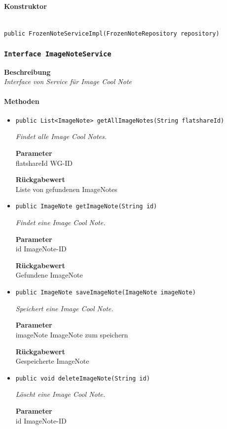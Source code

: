     \paragraph*{Konstruktor}\mbox{} \\
    \texttt{public FrozenNoteServiceImpl(FrozenNoteRepository repository)} \\
    \subsubsection{\texttt{Interface ImageNoteService}}
    \textbf{Beschreibung} \\
    \textit{Interface von Service für Image Cool Note}
    \paragraph*{Methoden}
    \begin{itemize}
    	\item{\texttt{public List<ImageNote> getAllImageNotes(String flatshareId)}}
    	
    	\textit{Findet alle Image Cool Notes.}
    	
    	\textbf{Parameter} \\
    	flatshareId WG-ID
    	
    	\textbf{Rückgabewert} \\
    	Liste von gefundenen ImageNotes        \item{\texttt{public ImageNote getImageNote(String id)}}
    	
    	\textit{Findet eine Image Cool Note.}
    	
    	\textbf{Parameter} \\
    	id ImageNote-ID
    	
    	\textbf{Rückgabewert} \\
    	Gefundene ImageNote        \item{\texttt{public ImageNote saveImageNote(ImageNote imageNote)}}
    	
    	\textit{Speichert eine Image Cool Note.}
    	
    	\textbf{Parameter} \\
    	imageNote ImageNote zum speichern
    	
    	\textbf{Rückgabewert} \\
    	Gespeicherte ImageNote        \item{\texttt{public void deleteImageNote(String id)}}
    	
    	\textit{Löscht eine Image Cool Note.}
    	
    	\textbf{Parameter} \\
    	id ImageNote-ID
    	
    	
    \end{itemize}
